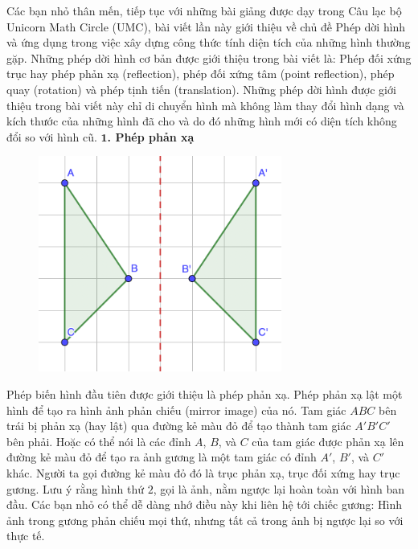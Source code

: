 \begin{multicols}{2}
	Các bạn nhỏ thân mến, tiếp tục với những bài giảng được dạy trong Câu lạc bộ Unicorn Math Circle (UMC), bài viết lần này giới thiệu về chủ đề Phép dời hình và ứng dụng trong việc xây dựng công thức tính diện tích của những hình thường gặp. Những phép dời hình cơ bản được giới thiệu trong bài viết là: Phép đối xứng trục hay phép phản xạ (reflection), phép đối xứng tâm (point reflection), phép quay (rotation) và phép tịnh tiến (translation).
	\vskip 0.1cm
	Những phép dời hình được giới thiệu trong bài viết này chỉ di chuyển hình mà không làm thay đổi hình dạng và kích thước của những hình đã cho và do đó những hình mới có diện tích không đổi so với hình cũ.
	\vskip 0.1cm
	\textbf{\color{toancuabi}$\pmb1$. Phép phản xạ}
	\begin{figure}[H]
		\vspace*{-10pt}
		\centering
		\captionsetup{labelformat= empty, justification=centering}
		\includegraphics[width= 0.65\linewidth]{Picture1}
		\vspace*{-10pt}
	\end{figure}
	Phép biến hình đầu tiên được giới thiệu là phép phản xạ. Phép phản xạ lật một hình để tạo ra hình ảnh phản chiếu (mirror image) của nó.
	\vskip 0.1cm
	Tam giác $ABC$ bên trái bị phản xạ (hay lật) qua đường kẻ màu đỏ để tạo thành tam giác $A'B'C'$ bên phải. Hoặc có thể nói là các đỉnh $A$, $B$, và $C$ của tam giác được phản xạ lên đường kẻ màu đỏ để tạo ra ảnh gương là một tam giác có đỉnh $A'$, $B'$, và $C'$ khác. Người ta gọi đường kẻ màu đỏ đó là trục phản xạ, trục đối xứng hay trục gương. Lưu ý rằng hình thứ $2$, gọi là ảnh, nằm ngược lại hoàn toàn với hình ban đầu. Các bạn nhỏ có thể dễ dàng nhớ điều này khi liên hệ tới chiếc gương: Hình ảnh trong gương phản chiếu mọi thứ, nhưng tất cả trong ảnh bị ngược lại so với thực tế.

\end{multicols}
